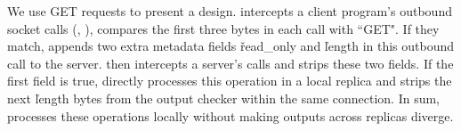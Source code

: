 We use GET requests to present a design. \xxx intercepts a client program's 
outbound socket calls (\eg, \send), compares the first three bytes in each call 
with ``GET". If they match, \xxx appends two extra \xxx metadata fields 
\v{read\_only} and \v{length} in this outbound call to the server. \xxx then 
intercepts a server's \recv calls and strips these two fields. If the first 
field is true, \xxx directly processes this operation in a local replica 
and strips the next \v{length} bytes from the output checker within the same
connection. In sum, \xxx processes these operations locally without making 
outputs across replicas diverge.













